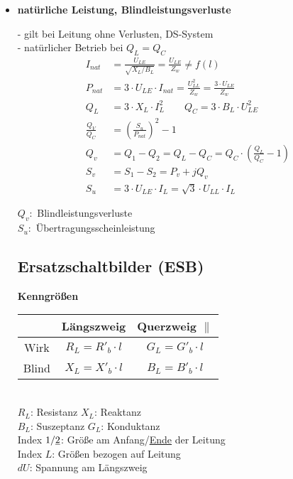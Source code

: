 \begin{itemize}
    \item[] \textbf{natürliche Leistung, Blindleistungsverluste}

        - gilt bei Leitung ohne Verlusten, DS-System\\
        - natürlicher Betrieb bei $Q_L = Q_C$
        \begin{align*}
            I_{nat} &= \frac{U_{LE}}{\sqrt{X_L/B_L}} =  \frac{U_{LE}}{Z_w} \neq f(l)\\
            P_{nat} &= 3 \cdot U_{LE} \cdot I_{nat} = \frac{U^2_{LL}}{Z_w} = \frac{3 \cdot U_{LE}}{Z_w}\\
            Q_L &= 3 \cdot X_L \cdot I_L^2 \qquad Q_C = 3 \cdot B_L \cdot U^2_{LE}\\
            \frac{Q_V}{Q_C} &= \left(\frac{S_u}{P_{nat}} \right)^2-1\\
            Q_v &= Q_1 - Q_2 = Q_L - Q_C = Q_C \cdot (\frac{Q_L}{Q_C}-1)\\
            S_v &= S_1 - S_2 = P_v + j Q_v\\
            S_u &= 3 \cdot U_{LE} \cdot I_L = \sqrt{3} \cdot U_{LL} \cdot I_L
        \end{align*}

        \indent $Q_v:$ Blindleistungsverluste\\
        \indent $S_u:$ Übertragungsscheinleistung

\subsection{Ersatzschaltbilder (ESB)}

\textbf{Kenngrößen}\\

\begin{tabular}[h]{c|c|c}
    & Längszweig & Querzweig $\parallel$ \\
    \hline
    Wirk & $R_L = R'_b \cdot l$ & $G_L= G'_b \cdot l$\\
    Blind & $X_L = X'_b \cdot l$ & $B_L = B'_b \cdot l$\\
\end{tabular}\\

$R_L$: Resistanz \qquad $X_L$: Reaktanz\\
$B_L$: Suszeptanz \qquad $G_L$: Konduktanz\\

Index $1/\underline{2}$: Größe am Anfang/\ul{Ende} der Leitung\\
Index $L$: Größen bezogen auf Leitung\\
$dU$: Spannung am Längszweig\\


\end{itemize}
